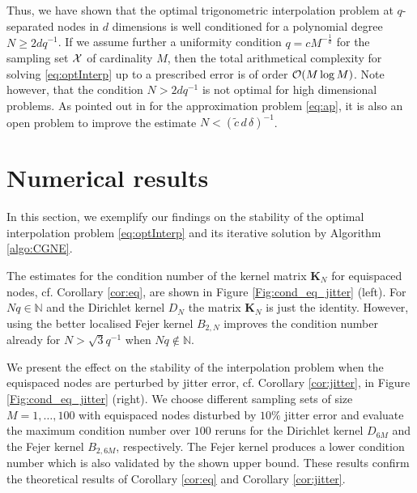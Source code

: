 \documentclass[11pt,a4paper,bibtotoc]{scrartcl}
\def\N{\mathbb{N}}
\newcommand{\zb}[1]{\ensuremath{\boldsymbol{#1}}}
\numberwithin{equation}{section}
\numberwithin{table}{section}
\numberwithin{figure}{section}
\begin{document}
Thus, we have shown that the optimal trigonometric interpolation problem at
$q$-separated nodes in $d$ dimensions is well conditioned for a polynomial
degree $N \ge 2 d q^{-1}$.
If we assume further a uniformity condition $q=c M^{-\frac{1}{d}}$ for the
sampling set  ${\cal X}$ of cardinality $M$, then the total arithmetical complexity for
solving \eqref{eq:optInterp} up to a prescribed error is of order ${\cal O}(M
\log M)$.
Note however, that the condition $N> 2 d q^{-1}$ is not optimal for high
dimensional problems.
As pointed out in \cite{BaGr04} for the approximation problem \eqref{eq:ap},
it is also an open problem to improve the estimate $N<(\tilde c \,d
\,\delta)^{-1}$.

\section{Numerical results}
In this section, we exemplify our findings on the stability of the optimal
interpolation problem \eqref{eq:optInterp} and its iterative solution by
Algorithm \ref{algo:CGNE}.

The estimates for the condition number of the kernel matrix $\zb K_N$ for
equispaced nodes, cf. Corollary \ref{cor:eq}, are shown in Figure
\ref{Fig:cond_eq_jitter} (left).
For $Nq\in \N$ and the Dirichlet kernel $D_N$ the matrix $\zb K_N$ is
just the identity.
However, using the better localised Fejer kernel $B_{2,N}$ improves the
condition number already for $N>\sqrt{3}q^{-1}$ when $Nq\not\in \N$.

We present the effect on the stability of the interpolation problem when the
equispaced nodes are perturbed by jitter error, cf. Corollary
\ref{cor:jitter}, in Figure \ref{Fig:cond_eq_jitter} (right).
We choose different sampling sets of size $M=1,\hdots,100$ with equispaced
nodes disturbed by $10\%$ jitter error and evaluate the maximum condition
number over $100$ reruns for the Dirichlet kernel $D_{6M}$ and the Fejer
kernel $B_{2,6M}$, respectively.
The Fejer kernel produces a lower condition number which is also validated by
the shown upper bound. These results confirm the theoretical results
of Corollary \ref{cor:eq} and Corollary \ref{cor:jitter}.
\end{document}
